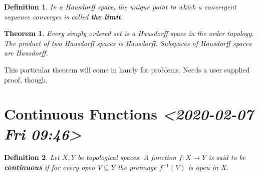 \documentclass[11pt]{article}
\newtheorem{theorem}{Theorem}[section]
\newtheorem{definition}{Definition}[section]
\begin{document}
\begin{definition}
In a Hausdorff space, the unique point to which a convergent sequence
converges is called \textbf{the limit}. 
\end{definition}

\begin{theorem}
Every simply ordered set is a Hausdorff space in the order
topology. The product of two Hausdorff spaces is Hausdorff. Subspaces
of Hausdorff spaces are Hausdorff. 
\end{theorem}

This particular theorem will come in handy for problems. Needs a user
supplied proof, though.

\section{Continuous Functions \textit{<2020-02-07 Fri 09:46>}}
\label{sec:org384eac9}
\begin{definition}
Let \(X,Y\) be topological spaces. A function \(f: X\rightarrow Y\) is
said to be \textbf{continuous} if for every open \(V \subseteq Y\) the
preimage \(f^{-1}(V)\) is open in \(X\). 
\end{definition}
\end{document}
